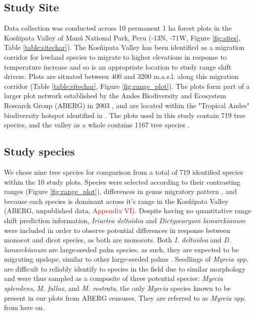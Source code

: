 \documentclass[a4paper,11pt]{article}
\newcommand{\todo}[1]{\textcolor{red}{#1}}   %
\begin{document}
\subsection{Study Site}
Data collection was conducted across 10 permanent 1 ha forest plots in the Kos\~{n}ipata Valley of Man\'{u} National Park, Peru (-13\textdegree N, -71\textdegree W, Figure \ref{fig:sites}, Table \ref{table:sitechar}). The Kos\~{n}ipata Valley has been identified as a migration corridor for lowland species to migrate to higher elevations in response to temperature increase \citep{Feeley2011} and so is an appropriate location to study range shift drivers. Plots are situated between 400 and 3200 m.a.s.l. along this migration corridor (Table \ref{table:sitechar}, Figure \ref{fig:range_plot}). The plots form part of a larger plot network established by the Andes Biodiversity and Ecosystem Research Group (ABERG) in 2003 \citep{Malhi2010, Girardin2014}, and are located within the "Tropical Andes" biodiversity hotspot identified in \citet{Myers2000}. The plots used in this study contain 719 tree species, and the valley as a whole contains 1167 tree species \citep{}.

\subsection{Study species} 
We chose nine tree species for comparison from a total of 719 identified species within the 10 study plots. Species were selected according to their contrasting ranges (Figure \ref{fig:range_plot}), differences in genus migratory pattern \citep{Feeley2011}, and because each species is dominant across it's range in the Kos\~{n}ipata Valley (ABERG, unpublished data, \todo{Appendix VI}). Despite having no quantitative range shift prediction information, \textit{Iriartea deltoidea} and \textit{Dictyocaryum lamarckianum} were included in order to observe potential differences in response between monocot and dicot species, as both are monocots. Both \textit{I. deltoidea} and \textit{D. lamarckianum} are large-seeded palm species, as such, they are expected to be migrating upslope, similar to other large-seeded palms \citep{Hillyer2010}. Seedlings of \textit{Myrcia spp.} are difficult to reliably identify to species in the field due to similar morphology and were thus sampled as a composite of three potential species: \textit{Myrcia splendens}, \textit{M. fallax}, and \textit{M. rostrata}, the only \textit{Myrcia} species known to be present in our plots from ABERG censuses. They are referred to as \textit{Myrcia spp.} from here on. 
\end{document}
